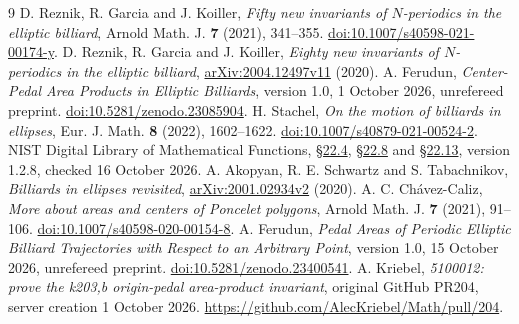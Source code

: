 \documentclass[11pt]{article}
\begin{document}
\begin{thebibliography}{9}
 D. Reznik, R. Garcia and J. Koiller,
\emph{Fifty new invariants of $N$-periodics in the elliptic billiard},
Arnold Math. J. \textbf{7} (2021), 341--355.
\href{https://doi.org/10.1007/s40598-021-00174-y}{doi:10.1007/s40598-021-00174-y}.
 D. Reznik, R. Garcia and J. Koiller,
\emph{Eighty new invariants of $N$-periodics in the elliptic billiard},
\href{https://arxiv.org/abs/2004.12497v11}{arXiv:2004.12497v11} (2020).
 A. Ferudun,
\emph{Center-Pedal Area Products in Elliptic Billiards},
version 1.0, 1 October 2026, unrefereed preprint.
\href{https://doi.org/10.5281/zenodo.23085904}{doi:10.5281/zenodo.23085904}.
 H. Stachel, \emph{On the motion of billiards in ellipses},
Eur. J. Math. \textbf{8} (2022), 1602--1622.
\href{https://doi.org/10.1007/s40879-021-00524-2}{doi:10.1007/s40879-021-00524-2}.
 NIST Digital Library of Mathematical Functions,
\href{https://dlmf.nist.gov/22.4}{\S22.4},
\href{https://dlmf.nist.gov/22.8}{\S22.8} and
\href{https://dlmf.nist.gov/22.13}{\S22.13}, version 1.2.8,
checked 16 October 2026.
 A. Akopyan, R. E. Schwartz and S. Tabachnikov,
\emph{Billiards in ellipses revisited},
\href{https://arxiv.org/abs/2001.02934v2}{arXiv:2001.02934v2} (2020).
 A. C. Ch\'avez-Caliz,
\emph{More about areas and centers of Poncelet polygons},
Arnold Math. J. \textbf{7} (2021), 91--106.
\href{https://doi.org/10.1007/s40598-020-00154-8}{doi:10.1007/s40598-020-00154-8}.
 A. Ferudun,
\emph{Pedal Areas of Periodic Elliptic Billiard Trajectories with Respect
to an Arbitrary Point}, version 1.0, 15 October 2026, unrefereed preprint.
\href{https://doi.org/10.5281/zenodo.23400541}{doi:10.5281/zenodo.23400541}.
 A. Kriebel, \emph{5100012: prove the k203,b origin-pedal
area-product invariant}, original GitHub PR204, server creation
1 October 2026. \url{https://github.com/AlecKriebel/Math/pull/204}.
\end{thebibliography}
\end{document}
